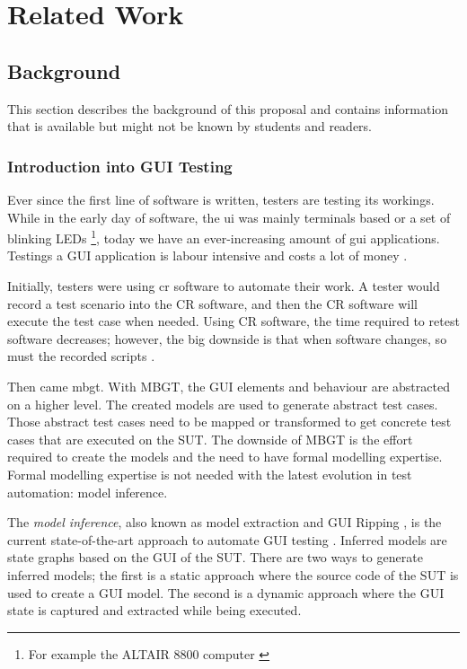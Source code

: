 \chapter{Related Work}


\section{Background} \label{background}
This section describes the background of this proposal and contains information that is available but might not be known by students and readers. 

\subsection{Introduction into GUI Testing}
Ever since the first line of software is written, testers are testing its workings. While in the early day of software, the \acrfull{ui} was mainly terminals based or a set of blinking LEDs \cite{altair8800} \footnote{For example the ALTAIR 8800 computer \cite{altair8800}}, today we have an ever-increasing amount of \acrfull{gui} applications. Testings a GUI application is labour intensive and costs a lot of money \cite{gui-history}.

Initially, testers were using \acrfull{cr} software to automate their work. A tester would record a test scenario into the CR software, and then the CR software will execute the test case when needed. Using CR software, the time required to retest software decreases; however, the big downside is that when software changes, so must the recorded scripts \cite{gui-history}.

Then came \acrfull{mbgt}. With MBGT, the GUI elements and behaviour are abstracted on a higher level. The created models are used to generate abstract test cases. Those abstract test cases need to be mapped or transformed to get concrete test cases that are executed on the SUT. The downside of MBGT is the effort required to create the models and the need to have formal modelling expertise. Formal modelling expertise is not needed with the latest evolution in test automation: model inference. 

The \emph{model inference}, also known as model extraction and GUI Ripping \cite{gui-ripping}, is the current state-of-the-art approach to automate GUI testing \cite{gui-history}. Inferred models are state graphs based on the GUI of the SUT. There are two ways to generate inferred models; the first is a static approach where the source code of the  SUT is used to create a GUI model. The second is a dynamic approach where the GUI state is captured and extracted while being executed. 

